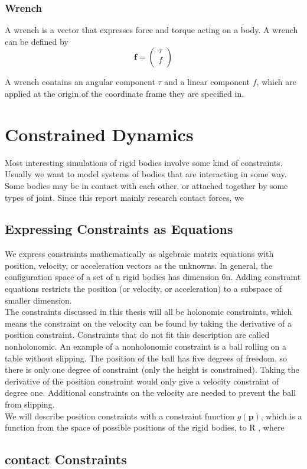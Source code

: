     \subsubsection{Wrench}
        A wrench is a vector that expresses force and torque acting on a body. A wrench can be defined by 
            $$\mathbf{f} = \left( \begin{array}{c} \tau \\ f \\ \end{array} \right )$$ 

        A wrench contains an angular component $\tau$ and a linear component $f$, which are applied at the origin of the coordinate frame they are specified in. 


\section{Constrained Dynamics}
    Most interesting simulations of rigid bodies involve some kind of constraints. Usually we want to model systems of bodies that are interacting in some way. Some bodies may be in contact with each other, or attached together by some types of joint. Since this report mainly research contact forces, we 
    \subsection{Expressing Constraints as Equations}
        We express constraints mathematically as algebraic matrix equations with position, velocity, or acceleration vectors as the unknowns. In general, the configuration space of a set of n rigid bodies has dimension 6n. Adding constraint equations restricts the position (or velocity, or acceleration) to a subspace of smaller dimension.\\

        The constraints discussed in this thesis will all be holonomic constraints, which means the constraint on the velocity can be found by taking the derivative of a position constraint. Constraints that do not fit this description are called nonholonomic. An example of a nonholonomic constraint is a ball rolling on a table without slipping. The position of the ball has five degrees of freedom, so there is only one degree of constraint (only the height is constrained). Taking the derivative of the position constraint would only give a velocity constraint of degree one. Additional constraints on the velocity are needed to prevent the ball from slipping.\\

        We will describe position constraints with a constraint function $g(\mathbf{p})$, which is a function from the space of possible positions of the rigid bodies, to R , where
    \subsection{contact Constraints}

\subsection{}